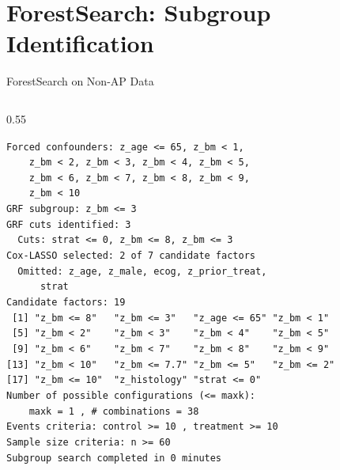 \documentclass[
  ignorenonframetext,
  aspectratio=169]{beamer}
\begin{document}
\section{ForestSearch: Subgroup
Identification}\label{forestsearch-subgroup-identification}

\begin{frame}{ForestSearch on Non-AP Data}
\label{forestsearch-on-non-ap-data}
\begin{columns}[T]
\begin{column}{0.55\textwidth}
{\tiny\raggedright
\texttt{Forced~confounders:~z\_age~<=~65,~z\_bm~<~1,~}\\[-2pt]
\texttt{~~~~z\_bm~<~2,~z\_bm~<~3,~z\_bm~<~4,~z\_bm~<~5,~}\\[-2pt]
\texttt{~~~~z\_bm~<~6,~z\_bm~<~7,~z\_bm~<~8,~z\_bm~<~9,~}\\[-2pt]
\texttt{~~~~z\_bm~<~10}\\[-2pt]
\texttt{GRF~subgroup:~z\_bm~<=~3}\\[-2pt]
\texttt{GRF~cuts~identified:~3}\\[-2pt]
\texttt{~~Cuts:~strat~<=~0,~z\_bm~<=~8,~z\_bm~<=~3}\\[-2pt]
\texttt{Cox-LASSO~selected:~2~of~7~candidate~factors}\\[-2pt]
\texttt{~~Omitted:~z\_age,~z\_male,~ecog,~z\_prior\_treat,~}\\[-2pt]
\texttt{~~~~~~strat}\\[-2pt]
\texttt{Candidate~factors:~19}\\[-2pt]
\texttt{~[1]~"z\_bm~<=~8"~~~"z\_bm~<=~3"~~~"z\_age~<=~65"~"z\_bm~<~1"}\\[-2pt]
\texttt{~[5]~"z\_bm~<~2"~~~~"z\_bm~<~3"~~~~"z\_bm~<~4"~~~~"z\_bm~<~5"}\\[-2pt]
\texttt{~[9]~"z\_bm~<~6"~~~~"z\_bm~<~7"~~~~"z\_bm~<~8"~~~~"z\_bm~<~9"}\\[-2pt]
\texttt{[13]~"z\_bm~<~10"~~~"z\_bm~<=~7.7"~"z\_bm~<=~5"~~~"z\_bm~<=~2"}\\[-2pt]
\texttt{[17]~"z\_bm~<=~10"~~"z\_histology"~"strat~<=~0"}\\[-2pt]
\texttt{Number~of~possible~configurations~(<=~maxk):~}\\[-2pt]
\texttt{~~~~maxk~=~1~,~\#~combinations~=~38}\\[-2pt]
\texttt{Events~criteria:~control~>=~10~,~treatment~>=~10}\\[-2pt]
\texttt{Sample~size~criteria:~n~>=~60}\\[-2pt]
\texttt{Subgroup~search~completed~in~0~minutes}\\[-2pt]
}
\end{column}
\end{columns}
\end{frame}
\end{document}
